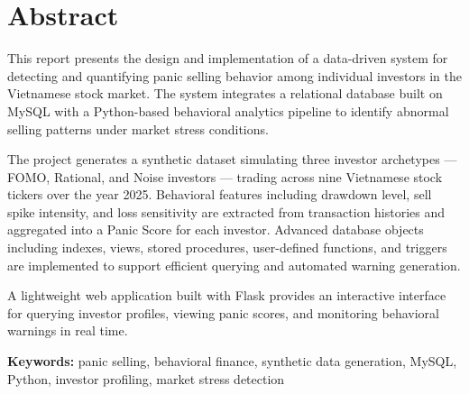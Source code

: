 \chapter*{Abstract}

This report presents the design and implementation of a data-driven system for detecting and quantifying panic selling behavior among individual investors in the Vietnamese stock market. The system integrates a relational database built on MySQL with a Python-based behavioral analytics pipeline to identify abnormal selling patterns under market stress conditions.

The project generates a synthetic dataset simulating three investor archetypes — FOMO, Rational, and Noise investors — trading across nine Vietnamese stock tickers over the year 2025. Behavioral features including drawdown level, sell spike intensity, and loss sensitivity are extracted from transaction histories and aggregated into a Panic Score for each investor. Advanced database objects including indexes, views, stored procedures, user-defined functions, and triggers are implemented to support efficient querying and automated warning generation.

A lightweight web application built with Flask provides an interactive interface for querying investor profiles, viewing panic scores, and monitoring behavioral warnings in real time.

\vspace{1cm}
\noindent\textbf{Keywords:} panic selling, behavioral finance, synthetic data generation, MySQL, Python, investor profiling, market stress detection
